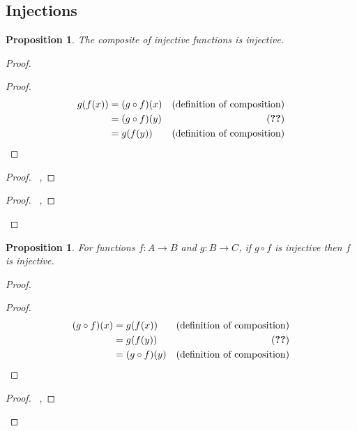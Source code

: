 \documentclass{book}
\let\qed\relax
\newtheorem{prop}[ax]{Proposition}
\theoremstyle{definition}
\begin{document}
\subsection{Injections} %

\begin{prop}
\label{prop:comp_inj}
The composite of injective functions is injective.
\end{prop}

\begin{proof}
\pf
{}
\begin{proof}
	\pf
	\begin{align*}
		g(f(x)) & = (g \circ f)(x) & (\text{definition of composition}) \\
		& = (g \circ f)(y) & (\text{\stepref{7}}) \\
		& = g(f(y))& (\text{definition of composition})
	\end{align*}
\end{proof}
\begin{proof}
	\pf\ , 
\end{proof}
\begin{proof}
	\pf\ , 
\end{proof}
\qed
\end{proof}

\begin{prop}
For functions $f : A \rightarrow B$ and $g : B \rightarrow C$, if $g \circ f$ is injective then $f$ is injective.
\end{prop}

\begin{proof}
\pf
{}
\begin{proof}
	\pf
	\begin{align*}
		(g \circ f)(x) & = g(f(x)) & (\text{definition of composition}) \\
		& = g(f(y)) & (\text{\stepref{6}}) \\
		& = (g \circ f)(y) & (\text{definition of composition})
	\end{align*}
\end{proof}
\begin{proof}
	\pf\ , 
\end{proof}
\qed
\end{proof}
\end{document}
